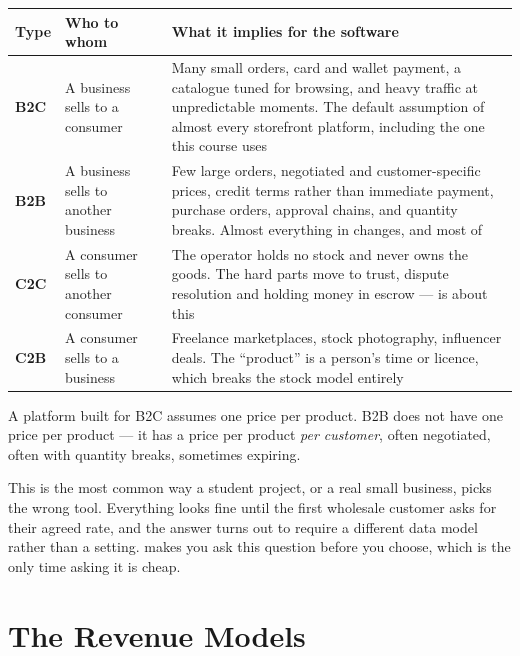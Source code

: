 \begin{longtable}{@{}L{1.4cm}L{5.2cm}L{8.2cm}@{}}
\toprule
{}
\textbf{Type} & \textbf{Who to whom} & \textbf{What it implies for the
software} \\
\midrule
\endhead
\textbf{B2C} & A business sells to a consumer & Many small orders, card and
wallet payment, a catalogue tuned for browsing, and heavy traffic at
unpredictable moments. The default assumption of almost every storefront
platform, including the one this course uses \\
\textbf{B2B} & A business sells to another business & Few large orders,
negotiated and customer-specific prices, credit terms rather than immediate
payment, purchase orders, approval chains, and quantity breaks. Almost
everything in  changes, and most of  \\
\textbf{C2C} & A consumer sells to another consumer & The operator holds no
stock and never owns the goods. The hard parts move to trust, dispute
resolution and holding money in escrow ---  is about this \\
\textbf{C2B} & A consumer sells to a business & Freelance marketplaces, stock
photography, influencer deals. The ``product'' is a person's time or licence,
which breaks the stock model entirely \\
\bottomrule
\end{longtable}

\begin{conceptbox}
A platform built for B2C assumes one price per product. B2B does not have one
price per product --- it has a price per product \emph{per customer}, often
negotiated, often with quantity breaks, sometimes expiring.

\smallskip
This is the most common way a student project, or a real small business, picks
the wrong tool. Everything looks fine until the first wholesale customer asks
for their agreed rate, and the answer turns out to require a different data
model rather than a setting.  makes you ask this question
before you choose, which is the only time asking it is cheap.
\end{conceptbox}

\section{The Revenue Models}

